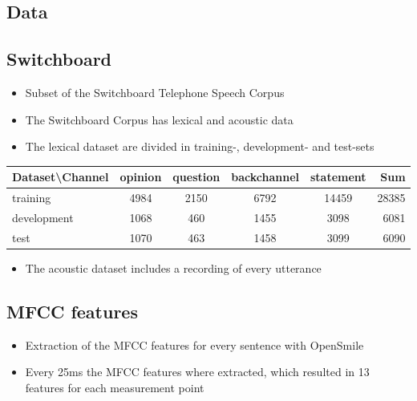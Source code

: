 \documentclass[a0,landscape]{a0poster}
\begin{document}
\begin{multicols}{3}

\color{Black} %

\section*{Data}
\subsection*{Switchboard}

\begin{itemize}
	\item Subset of the Switchboard Telephone Speech Corpus
	\item The Switchboard Corpus has lexical and acoustic data
	\item The lexical dataset are divided in training-, development- and test-sets
\end{itemize}

\large
\begin{tabular}{ l| c c c c || r}
	Dataset\textbackslash Channel & opinion & question & backchannel & statement & Sum\\
	\hline
	training & 4984 & 2150 & 6792 & 14459 & 28385\\
	development & 1068 & 460 & 1455 & 3098 & 6081\\
	test & 1070 & 463 & 1458 & 3099 & 6090\\
\end{tabular}
\normalsize

\begin{itemize}
	\item The acoustic dataset includes a recording of every utterance
\end{itemize}

\subsection*{MFCC features}
\begin{itemize}
	\item Extraction of the MFCC features for every sentence with OpenSmile
	\item Every 25ms the MFCC features where extracted, which resulted in 13 features for each measurement point
\end{itemize}


\end{multicols}
\end{document}
